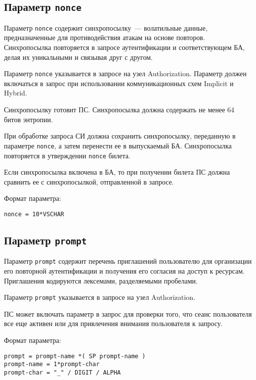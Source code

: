 \subsection{Параметр \lstinline{nonce}}\label{PARAMS.Nonce} 

Параметр \lstinline{nonce} содержит синхропосылку~--- 
волатильные данные, предназначенные для противодействия атакам на основе 
повторов. Синхропосылка повторяется в запросе аутентификации и соответствующем 
БА, делая их уникальными и связывая друг с другом. 

Параметр \lstinline{nonce} указывается в запросе на узел Authorization.
%
Параметр должен включаться в запрос при использовании коммуникационных 
схем Implicit и Hybrid.

Синхропосылку готовит ПС. Синхропосылка должна содержать не менее 64 битов 
энтропии.

При обработке запроса СИ должна сохранить синхропосылку, переданную в параметре
\lstinline{nonce}, а затем перенести ее в выпускаемый БА. Синхропосылка 
повторяется в утверждении \lstinline{nonce} билета.

Если синхропосылка включена в БА, то при получении билета ПС должна сравнить ее 
с синхропосылкой, отправленной в запросе.

Формат параметра:
\begin{lstlisting}
nonce = 10*VSCHAR
\end{lstlisting}

\subsection{Параметр \lstinline{prompt}}\label{PARAMS.Prompt}

Параметр \lstinline{prompt} содержит перечень приглашений пользователю для
организации его повторной аутентификации и получения его согласия на доступ к
ресурсам. Приглашения кодируются лексемами, разделяемыми пробелами.

Параметр \lstinline{prompt} указывается в запросе на узел Authorization.

ПС может включать параметр в запрос для проверки того, что сеанс пользователя 
все еще активен или для привлечения внимания пользователя к запросу.


Формат параметра:
\begin{lstlisting}
prompt = prompt-name *( SP prompt-name )
prompt-name = 1*prompt-char
prompt-char = "_" / DIGIT / ALPHA
\end{lstlisting}

